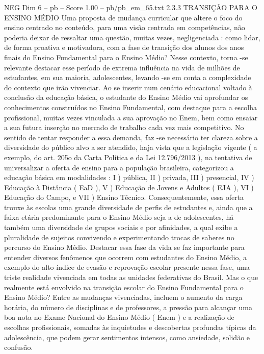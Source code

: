 \begin{textsample}{NEG Dim 6 – pb – Score 1.00 – pb/pb\_em\_65.txt}  \label{ex:f6_neg_085}
2.3.3 TRANSIÇÃO PARA O ENSINO MÉDIO Uma proposta de mudança curricular que altere o foco do ensino centrado no conteúdo, para uma visão centrada em competências, não poderia deixar de ressaltar uma questão, muitas vezes, negligenciada : como lidar, de forma proativa e motivadora, com a fase de transição dos alunos dos anos finais do Ensino Fundamental para o Ensino Médio?
Nesse contexto, torna -se relevante destacar esse período de extrema influência na vida de milhões de estudantes, em sua maioria, adolescentes, levando -se em conta a complexidade do contexto que irão vivenciar.
Ao se inserir num cenário educacional voltado à conclusão da educação básica, o estudante do Ensino Médio vai aprofundar os conhecimentos construídos no Ensino Fundamental, com destaque para a escolha profissional, muitas vezes vinculada a sua aprovação no Enem, bem como ensaiar a sua futura inserção no mercado de trabalho cada vez mais competitivo.
No sentido de tentar responder a essa demanda, faz -se necessário ter clareza sobre a diversidade do público alvo a ser atendido, haja vista que a legislação vigente ( a exemplo, do art. 205o da Carta Política e da Lei 12.796/2013 ), na tentativa de universalizar a oferta de ensino para a população brasileira, categorizou a educação básica em modalidades : I ) pública, II ) privada, III ) presencial, IV ) Educação à Distância ( EaD ), V ) Educação de Jovens e Adultos ( EJA ), VI ) Educação do Campo, e VII ) Ensino Técnico.
Consequentemente, essa oferta trouxe às escolas uma grande diversidade de perfis de estudantes e, ainda que a faixa etária predominante para o Ensino Médio seja a de adolescentes, há também uma diversidade de grupos sociais e por afinidades, a qual exibe a pluralidade de sujeitos convivendo e experimentando trocas de saberes no percurso do Ensino Médio.
Destacar essa fase da vida se faz importante para entender diversos fenômenos que ocorrem com estudantes do Ensino Médio, a exemplo do alto índice de evasão e reprovação escolar presente nessa fase, uma triste realidade vivenciada em todas as unidades federativas do Brasil.
Mas o que realmente está envolvido na transição escolar do Ensino Fundamental para o Ensino Médio?
Entre as mudanças vivenciadas, incluem o aumento da carga horária, do número de disciplinas e de professores, a pressão para alcançar uma boa nota no Exame Nacional do Ensino Médio ( Enem ) e a realização de escolhas profissionais, somadas às inquietudes e descobertas profundas típicas da adolescência, que podem gerar sentimentos intensos, como ansiedade, solidão e confusão.

\end{textsample}
